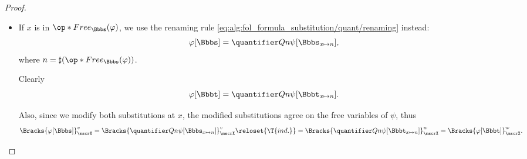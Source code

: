 \begin{proof}
\begin{itemize}
\begin{itemize}
      Since \( \op*{Free}_\Bbbs(\varphi) = \op*{Free}_\Bbbt(\varphi) \), we also have
      \begin{equation*}
        \varphi[\Bbbt] = \quantifier Q x \psi[\Bbbt_{x \mapsto y}].
      \end{equation*}

      It remains to show that \( \Bbbs_{x \mapsto x} \) agrees with \( \Bbbt_{x \mapsto x} \) on the free variables of \( \phi \). This is obvious for the variables that are free in \( \varphi \). The only other possibility is \( x \), on which we modify the substitutions. Thus,
      \begin{equation*}
        \Bracks{\varphi[\Bbbs]}_\mscrX^v
        =
        \Bracks{\quantifier Q x \psi[\Bbbs_{x \mapsto x}]}_\mscrX^v
        \reloset {\T{ind.}} =
        \Bracks{\quantifier Q x \psi[\Bbbt_{x \mapsto x}]}_\mscrX^w
        =
        \Bracks{\varphi[\Bbbt]}_\mscrX^w.
      \end{equation*}

      \item If \( x \) is in \( \op*{Free}_\Bbbs(\varphi) \), we use the renaming rule \eqref{eq:alg:fol_formula_substitution/quant/renaming} instead:
      \begin{equation*}
        \varphi[\Bbbs] = \quantifier Q n \psi[\Bbbs_{x \mapsto n}],
      \end{equation*}
      where \( n = \sharp(\op*{Free}_\Bbbs(\varphi)) \).

      Clearly
      \begin{equation*}
        \varphi[\Bbbt] = \quantifier Q n \psi[\Bbbt_{x \mapsto n}].
      \end{equation*}

      Also, since we modify both substitutions at \( x \), the modified substitutions agree on the free variables of \( \psi \), thus
      \begin{equation*}
        \Bracks{\varphi[\Bbbs]}_\mscrX^v
        =
        \Bracks{\quantifier Q n \psi[\Bbbs_{x \mapsto n}]}_\mscrX^v
        \reloset {\T{ind.}} =
        \Bracks{\quantifier Q n \psi[\Bbbt_{x \mapsto n}]}_\mscrX^w
        =
        \Bracks{\varphi[\Bbbt]}_\mscrX^w.
      \end{equation*}
    \end{itemize}
  \end{itemize}
\end{proof}

